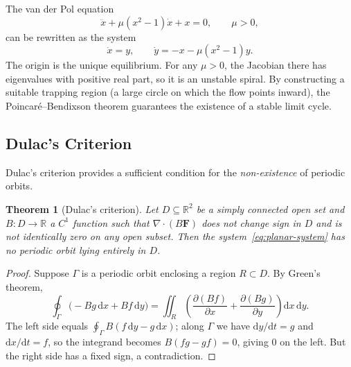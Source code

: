 \documentclass[12pt,a4paper,openany]{book}
\theoremstyle{definition}
\theoremstyle{plain}
\newtheorem{theorem}[definition]{Theorem}
\theoremstyle{remark}
\newcommand{\R}{\mathbb{R}}
\newcommand{\dd}{\mathrm{d}}
\begin{document}
The van der Pol equation
\begin{equation}\label{eq:van-der-pol}
  \ddot{x} + \mu(x^{2}-1)\dot{x} + x = 0, \qquad \mu>0,
\end{equation}
can be rewritten as the system
\[
  \dot{x} = y, \qquad \dot{y} = -x - \mu(x^{2}-1)y.
\]
The origin is the unique equilibrium. For any $\mu>0$, the Jacobian
there has eigenvalues with positive real part, so it is an unstable
spiral. By constructing a suitable trapping region (a large circle on
which the flow points inward), the Poincar\'e--Bendixson theorem
guarantees the existence of a stable limit cycle.

\begin{center}
\end{center}

\subsection{Dulac's Criterion}
\label{subsec:dulac}

Dulac's criterion provides a sufficient condition for the
\emph{non-existence} of periodic orbits.

\begin{theorem}[Dulac's criterion]
\label{thm:dulac}
Let $D\subseteq\R^{2}$ be a simply connected open set and
$B\colon D\to\R$ a $C^{1}$ function such that
$\nabla\cdot(B\mathbf{F})$ does not change sign in $D$ and is not
identically zero on any open subset. Then the
system~\eqref{eq:planar-system} has no periodic orbit lying entirely
in $D$.
\end{theorem}

\begin{proof}
Suppose $\Gamma$ is a periodic orbit enclosing a region $R\subset D$.
By Green's theorem,
\[
  \oint_{\Gamma} \bigl(-Bg\,\dd x + Bf\,\dd y\bigr)
  = \iint_{R} \left(\frac{\partial(Bf)}{\partial x}
    + \frac{\partial(Bg)}{\partial y}\right)\dd x\,\dd y.
\]
The left side equals
$\oint_{\Gamma}B(f\,\dd y - g\,\dd x)$; along $\Gamma$ we have
$\dd y/\dd t = g$ and $\dd x/\dd t = f$, so the integrand becomes
$B(f g - g f)=0$, giving $0$ on the left. But the right side has
a fixed sign, a contradiction.
\end{proof}
\end{document}
